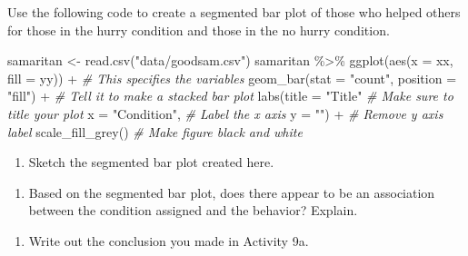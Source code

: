 \documentclass[
]{report}
\newenvironment{Shaded}{\begin{snugshade}}{\end{snugshade}}
\newcommand{\AttributeTok}[1]{\textcolor[rgb]{0.77,0.63,0.00}{#1}}
\newcommand{\CommentTok}[1]{\textcolor[rgb]{0.56,0.35,0.01}{\textit{#1}}}
\newcommand{\FunctionTok}[1]{\textcolor[rgb]{0.00,0.00,0.00}{#1}}
\newcommand{\NormalTok}[1]{#1}
\newcommand{\OtherTok}[1]{\textcolor[rgb]{0.56,0.35,0.01}{#1}}
\newcommand{\SpecialCharTok}[1]{\textcolor[rgb]{0.00,0.00,0.00}{#1}}
\newcommand{\StringTok}[1]{\textcolor[rgb]{0.31,0.60,0.02}{#1}}
\providecommand{\tightlist}{%
  \setlength{\itemsep}{0pt}\setlength{\parskip}{0pt}}
\begin{document}
Use the following code to create a segmented bar plot of those who helped others for those in the hurry condition and those in the no hurry condition.

\begin{Shaded}
\begin{Highlighting}[]
\NormalTok{samaritan }\OtherTok{\textless{}{-}} \FunctionTok{read.csv}\NormalTok{(}\StringTok{"data/goodsam.csv"}\NormalTok{)}
\NormalTok{samaritan }\SpecialCharTok{\%\textgreater{}\%}
        \FunctionTok{ggplot}\NormalTok{(}\FunctionTok{aes}\NormalTok{(}\AttributeTok{x =}\NormalTok{ xx, }\AttributeTok{fill =}\NormalTok{ yy)) }\SpecialCharTok{+}   \CommentTok{\# This specifies the variables}
  \FunctionTok{geom\_bar}\NormalTok{(}\AttributeTok{stat =} \StringTok{"count"}\NormalTok{, }\AttributeTok{position =} \StringTok{"fill"}\NormalTok{) }\SpecialCharTok{+}  \CommentTok{\# Tell it to make a stacked bar plot}
  \FunctionTok{labs}\NormalTok{(}\AttributeTok{title =} \StringTok{"Title"}
       \CommentTok{\# Make sure to title your plot }
       \AttributeTok{x =} \StringTok{"Condition"}\NormalTok{,   }\CommentTok{\# Label the x axis}
       \AttributeTok{y =} \StringTok{""}\NormalTok{) }\SpecialCharTok{+}  \CommentTok{\# Remove y axis label}
    \FunctionTok{scale\_fill\_grey}\NormalTok{()  }\CommentTok{\# Make figure black and white}
\end{Highlighting}
\end{Shaded}

\begin{enumerate}
\def\labelenumi{\arabic{enumi}.}
\setcounter{enumi}{1}
\tightlist
\item
  Sketch the segmented bar plot created here.
\end{enumerate}

\vspace{1.5in}

\begin{enumerate}
\def\labelenumi{\arabic{enumi}.}
\setcounter{enumi}{2}
\tightlist
\item
  Based on the segmented bar plot, does there appear to be an association between the condition assigned and the behavior? Explain.
\end{enumerate}

\vspace{1in}

\begin{enumerate}
\def\labelenumi{\arabic{enumi}.}
\setcounter{enumi}{3}
\tightlist
\item
  Write out the conclusion you made in Activity 9a.
\end{enumerate}
\end{document}
